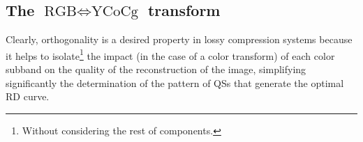 \begin{comment}
Unfortunately, the RGB-to-YCrCb transform is not orthogonal (for
example, in Eq.~\ref{eq:YCrCb_analysis}, the value of Cr depends on the
value of Y, and therefore, there is a dependency between both
\href{https://en.wikipedia.org/wiki/Basis_(linear_algebra)}{basis})\footnote{This
can be also seen computing the
\href{https://en.wikipedia.org/wiki/Dot_product}{inner product} of the
basis functions of the analysis transform (only the inner product of
orthogonal vectors is 0). Thus, for example, the product of the basis
functions for Y and Cr is $0.299\times 0.5+0.587\times (-0.4187) +
0.144\times (-0.0813) = -0.1055451$.} and therefore neither the RGB
and the YCrCb spaces. This dificults the finding of
$\Delta^*_{\text{Y}}$, $\Delta^*_{\text{Cr}}$, and
$\Delta^*_{\text{Cb}}$ because the quantization error generated in one
of the components influences the quantization error of the rest of
components, and when this happens, we cannot use CS-RS-QS.

Anyway, as you can see in this
\href{https://github.com/Sistemas-Multimedia/Sistemas-Multimedia.github.io/blob/master/study_guide/06-color_transform/performance.ipynb}{notebook},
the use of the YCrCb color domain can be beneficial, even using a
simple quantization strategy such as
\begin{equation}
  \Delta_{\text{Y}} = \Delta_{\text{Cr}} = \Delta_{\text{Cb}}.
\end{equation}
As it can be seen, the RD curves can be improved for most bit-rates,
and therefore, it can be an interesting tool for removing the
intercomponent redundancy from a pure mathematical point of view.
\end{comment}

\subsection{The $\text{RGB} \Leftrightarrow \text{YCoCg}$ transform}
Clearly, orthogonality is a desired property in lossy compression
systems because it helps to isolate\footnote{Without considering the
rest of components.} the impact (in the case of a color transform) of
each color subband on the quality of the reconstruction of the image,
simplifying significantly the determination of the pattern of QSs that
generate the optimal RD curve.

